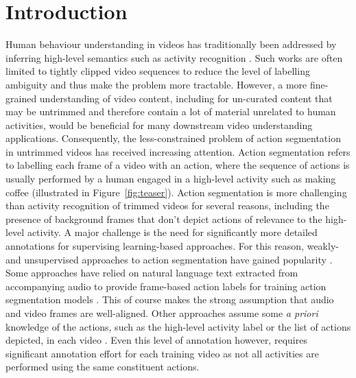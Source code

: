 \documentclass[10pt,twocolumn,letterpaper]{article}
\begin{document}
\section{Introduction}
Human behaviour understanding in videos has traditionally been addressed by inferring high-level semantics such as activity recognition \cite{herath2017going,asadi2017deep}.
Such works are often limited to tightly clipped video sequences to reduce the level of labelling ambiguity and thus make the problem more tractable.
However, a more fine-grained understanding of video content, including for un-curated content that may be untrimmed and therefore contain a lot of material unrelated to human activities, would be beneficial for many downstream video understanding applications.
Consequently, the less-constrained problem of action segmentation in untrimmed videos has received increasing attention.
Action segmentation refers to labelling each frame of a video with an action, where the sequence of actions is usually performed by a human engaged in a high-level activity such as making coffee (illustrated in Figure~\ref{fig:teaser}).
Action segmentation is more challenging than activity recognition of trimmed videos for several reasons, including the presence of background frames that don't depict actions of relevance to the high-level activity.
A major challenge is the need for significantly more detailed annotations for supervising learning-based approaches.
For this reason, weakly- and unsupervised approaches to action segmentation have gained popularity \cite{mucon,actionset,ute_paper,mallow}.
Some approaches have relied on natural language text extracted from accompanying audio to provide frame-based action labels for training action segmentation models \cite{yti_paper}. This of course makes the strong assumption that audio and video frames are well-aligned. Other approaches assume some \textit{a priori} knowledge of the actions, such as the high-level activity label or the list of actions depicted, in each video \cite{sct,mucon}. Even this level of annotation however, requires significant annotation effort for each training video as not all activities are performed using the same constituent actions. 

\iffalse

\begin{figure}[t]
\centering
\texttt{[image: tex\_files/figs/front\_action\_v2.pdf]}
\vspace{0.25cm}
\caption{Segmentation output example from Breakfast Dataset~\cite{ute_15}: \textit{P39\_cam02\_P39\_scrambledegg}.  Colors indicate different actions in chronological order:  SIL, butter\_pan, crack\_egg, add\_saltnpepper, stirfry\_egg, take\_plate, put\_egg2plate, SIL, where SIL is background shown in while color. We establish one-to-one color mappings between  our predicted segments and ground-truth.\label{fig:teaser} }
\end{figure}
\fi
\end{document}
